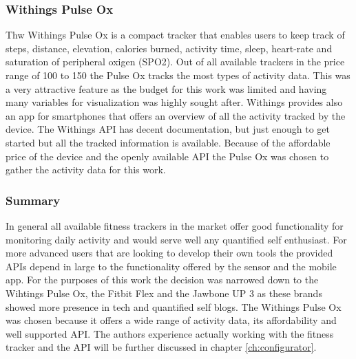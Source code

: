 \documentclass[../medieninformatik-arbeit.tex]{subfiles}
\begin{document}
\subsubsection*{Withings Pulse Ox}
Thw Withings Pulse Ox\cite{withingsProduct} is a compact tracker that enables users to keep track of steps, distance, elevation, calories burned, activity time, sleep, heart-rate and saturation of peripheral oxigen (SPO2). Out of all available trackers in the price range of \EUR{}100 to \EUR{}150 the Pulse Ox tracks the most types of activity data. This was a very attractive feature as the budget for this work was limited and having many variables for visualization was highly sought after. Withings provides also an app for smartphones that offers an overview of all the activity tracked by the device. The Withings API\cite{withingsApi} has decent documentation, but just enough to get started but all the tracked information is available. Because of the affordable price of the device and the openly available API the Pulse Ox was chosen to gather the activity data for this work.

\subsubsection*{Summary}
In general all available fitness trackers in the market offer good functionality for monitoring daily activity and would serve well any quantified self enthusiast. For more advanced users that are looking to develop their own tools the provided APIs depend in large to the functionality offered by the sensor and the mobile app. For the purposes of this work the decision was narrowed down to the Wihtings Pulse Ox, the Fitbit Flex and the Jawbone UP 3 as these brands showed more presence in tech and quantified self blogs. The Withings Pulse Ox was chosen because it offers a wide range of activity data, its affordability and well supported API. The authors experience actually working with the fitness tracker and the API will be further discussed in chapter \ref{ch:configurator}.
\end{document}
